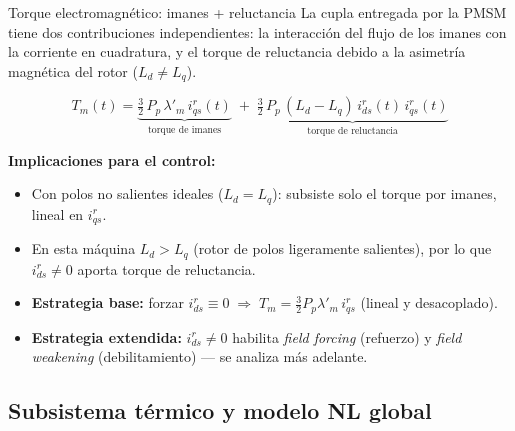 \documentclass[aspectratio=169,t]{beamer}
\begin{document}
\begin{frame}{Torque electromagnético: imanes + reluctancia}
{\small\color{uncGray}La cupla entregada por la PMSM tiene dos contribuciones independientes: la interacción del flujo de los imanes con la corriente en cuadratura, y el torque de reluctancia debido a la asimetría magnética del rotor ($L_d\neq L_q$).}\par
\vspace{8mm}

\begin{equation*}
\boxed{\;\;
T_m(t) = \underbrace{\tfrac{3}{2}\,P_p\,\lambda'_m\,i^{r}_{qs}(t)}_{\text{torque de imanes}} \;+\; \underbrace{\tfrac{3}{2}\,P_p\,(L_d - L_q)\,i^{r}_{ds}(t)\,i^{r}_{qs}(t)}_{\text{torque de reluctancia}}
\;\;}
\end{equation*}

\vspace{8mm}
\textbf{Implicaciones para el control:}
\begin{itemize}\small
\item Con polos no salientes ideales ($L_d=L_q$): subsiste solo el torque por imanes, lineal en $i^{r}_{qs}$.
\item En esta máquina $L_d>L_q$ (rotor de polos ligeramente salientes), por lo que $i^{r}_{ds}\neq 0$ aporta torque de reluctancia.
\item \textbf{Estrategia base:} forzar $i^{r}_{ds}\equiv 0 \;\Rightarrow\; T_m = \tfrac{3}{2}P_p\lambda'_m\,i^{r}_{qs}$ (lineal y desacoplado).
\item \textbf{Estrategia extendida:} $i^{r}_{ds}\neq 0$ habilita \emph{field forcing} (refuerzo) y \emph{field weakening} (debilitamiento) — se analiza más adelante.
\end{itemize}
\end{frame}


\subsection{Subsistema térmico y modelo NL global}
\end{document}
